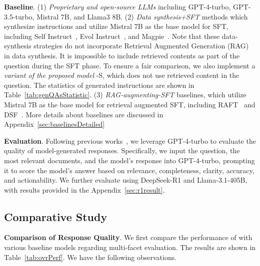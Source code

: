 \textbf{Baseline}. (1) \textit{Proprietary and open-source LLMs} including GPT-4-turbo, GPT-3.5-turbo, Mistral 7B, and Llama3 8B. (2) \textit{Data synthesis+SFT} methods which synthesize instructions and utilize Mistral 7B as the base model for SFT, including Self Instruct~\cite{zhang2023self}, Evol Instruct~\cite{Xu2023WizardLMEL}, and Magpie~\cite{xu2024magpie}. Note that these data-synthesis strategies do not incorporate Retrieval Augmented Generation (RAG) in data synthesis. It is impossible to include retrieved contents as part of the question during the SFT phase. To ensure a fair comparison, we also implement a \textit{variant of the proposed model} \ourmodel-S, which does not use retrieved content in the question. The statistics of generated instructions are shown in Table~\ref{tab:genQAsStatistic}. (3) \textit{RAG-augmenting-SFT} baselines, which utilize Mistral 7B as the base model for retrieval augmented SFT, including RAFT~\cite{zhang2024raft} and DSF~\cite{zhang2024raft}. More details about baselines are discussed in Appendix~\ref{sec:baselinesDetailed}




\textbf{Evaluation}. 
Following previous works~\cite{zhu2023judgelm,zheng2024judging}, we leverage GPT-4-turbo to evaluate the quality of model-generated responses. Specifically, we input the question, the most relevant documents, and the model's response into GPT-4-turbo, prompting it to score the model's answer based on relevance, completeness, clarity, accuracy, and actionability. We further evaluate \ourmodel using DeepSeek-R1 and Llama-3.1-405B, with results provided in the Appendix~\ref{sec:r1result}.


\subsection{Comparative Study}
\label{sec:comp_study}
\textbf{Comparison of Response Quality}. We first compare the performance of 
\ourmodel with various baseline models regarding multi-facet evaluation. The results are shown in Table~\ref{tab:ovrPerf}. We have the following observations.

